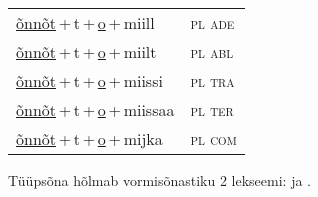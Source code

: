 \begin{minipage}{\textwidth}
\begin{sideways}
\begin{tabular}{l l}
\underline{õnnõt}\,+\,t\,+\,\underline{o}\,+\,miill & \textsc{ pl ade } \\
\underline{õnnõt}\,+\,t\,+\,\underline{o}\,+\,miilt & \textsc{ pl abl } \\
\underline{õnnõt}\,+\,t\,+\,\underline{o}\,+\,miissi & \textsc{ pl tra } \\
\underline{õnnõt}\,+\,t\,+\,\underline{o}\,+\,miissaa & \textsc{ pl ter } \\
\underline{õnnõt}\,+\,t\,+\,\underline{o}\,+\,mijka & \textsc{ pl com } \\
\end{tabular}
\end{sideways}
\label{tab:tüüpsõnamall-õnnõto}

\end{minipage}

 
\vspace{1em}
\noindent Tüüpsõna hõlmab vormisõnastiku 2 lekseemi:  ja .
